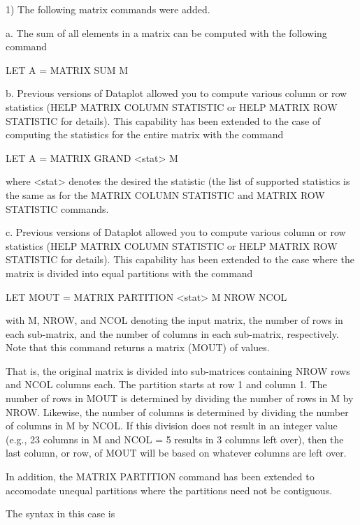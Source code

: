 { 1) The following matrix commands were added.

    a. The sum of all elements in a matrix can be computed with
       the following command

           LET A = MATRIX SUM M

    b. Previous versions of Dataplot allowed you to compute
       various column or row statistics
       (HELP MATRIX COLUMN STATISTIC or HELP MATRIX ROW STATISTIC
       for details).  This capability has been extended to the
       case of computing the statistics for the entire matrix
       with the command

          LET A = MATRIX GRAND <stat> M

       where <stat> denotes the desired the statistic (the list
       of supported statistics is the same as for the
       MATRIX COLUMN STATISTIC and MATRIX ROW STATISTIC commands.

    c. Previous versions of Dataplot allowed you to compute
       various column or row statistics
       (HELP MATRIX COLUMN STATISTIC or HELP MATRIX ROW STATISTIC
       for details).  This capability has been extended to the
       case where the matrix is divided into equal partitions
       with the command

          LET MOUT = MATRIX PARTITION <stat> M NROW NCOL

       with M, NROW, and NCOL denoting the input matrix, the number
       of rows in each sub-matrix, and the number of columns in
       each sub-matrix, respectively.  Note that this command
       returns a matrix (MOUT) of values.

       That is, the original matrix is divided into sub-matrices
       containing NROW rows and NCOL columns each.  The partition
       starts at row 1 and column 1. The number of rows in MOUT
       is determined by dividing the number of rows in M by NROW.
       Likewise, the number of columns is determined by dividing
       the number of columns in M by NCOL.  If this division
       does not result in an integer value (e.g., 23 columns
       in M and NCOL = 5 results in 3 columns left over), then the
       last column, or row, of MOUT will be based on whatever
       columns are left over.

       In addition, the MATRIX PARTITION command has been extended
       to accomodate unequal partitions where the partitions need
       not be contiguous.

       The syntax in this case is

}
